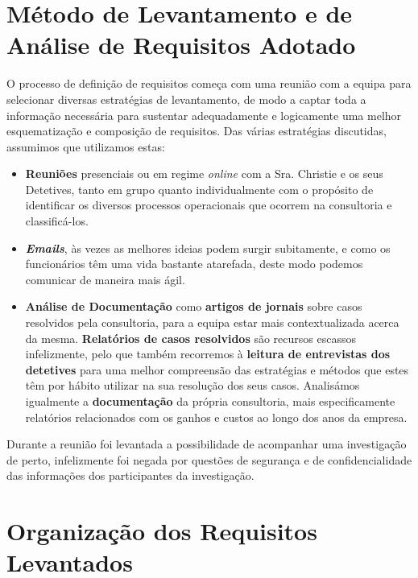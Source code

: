 \documentclass[a4paper,12pt]{scrreprt}
\begin{document}
    \section{Método de Levantamento e de Análise de Requisitos Adotado}
        \label{sec:2.1}
            O processo de definição de requisitos começa com uma reunião com a equipa para selecionar diversas estratégias de levantamento, de modo a captar toda a informação necessária para sustentar adequadamente e logicamente uma melhor esquematização e composição de requisitos. Das várias estratégias discutidas, assumimos que utilizamos estas:
            \begin{itemize}
            \item \textbf{Reuniões} presenciais ou em regime \textit{online} com a Sra. Christie e os seus Detetives, tanto em grupo quanto individualmente com o propósito de identificar os diversos processos operacionais que ocorrem na consultoria e classificá-los.
            \item \textit{\textbf{Emails}}, às vezes as melhores ideias podem surgir subitamente, e como os funcionários têm uma vida bastante atarefada, deste modo podemos comunicar de maneira mais ágil.
            \item \textbf{Análise de Documentação} como \textbf{artigos de jornais} sobre casos resolvidos pela consultoria, para a equipa estar mais contextualizada acerca da mesma.
            \textbf{Relatórios de casos resolvidos} são recursos escassos infelizmente, pelo que também recorremos à \textbf{leitura de entrevistas dos detetives} para uma melhor compreensão das estratégias e métodos que estes têm por hábito utilizar na sua resolução dos seus casos. Analisámos igualmente a \textbf{documentação} da própria consultoria, mais especificamente relatórios relacionados com os ganhos e custos ao longo dos anos da empresa.
            \end{itemize}
            
            Durante a reunião foi levantada a possibilidade de acompanhar uma investigação de perto, infelizmente foi negada por questões de segurança e de confidencialidade das informações dos participantes da investigação. 
            
    \section{Organização dos Requisitos Levantados}
        \label{sec:2.2}
\end{document}
